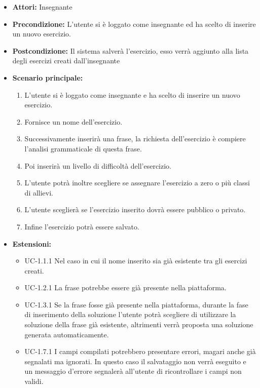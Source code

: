 	\begin{itemize}
		\item \textbf{Attori: }Insegnante
		\item \textbf{Precondizione: }L'utente si è loggato come insegnante ed ha scelto di inserire un nuovo esercizio.
		\item \textbf{Postcondizione: }Il sistema salverà l'esercizio, esso verrà aggiunto alla lista degli esercizi creati dall'insegnante
		\item \textbf{Scenario principale: }
		\begin{enumerate}
		\item L'utente si è loggato come insegnante e ha scelto di inserire un nuovo esercizio. 
		\item Fornisce un nome dell'esercizio. 
		\item Successivamente inserirà una frase, la richiesta dell'esercizio è compiere l'analisi grammaticale di questa frase. 
		\item Poi inserirà un livello di difficoltà dell'esercizio. 
		\item L'utente potrà inoltre scegliere se assegnare l'esercizio a zero o più classi di allievi.
		\item L'utente sceglierà se l'esercizio inserito dovrà essere pubblico o privato.
		\item Infine l'esercizio potrà essere salvato.
		\end{enumerate}
		
		\item \textbf{Estensioni: }
		\begin{itemize}
		\item UC-1.1.1 Nel caso in cui il nome inserito sia già esistente tra gli esercizi creati.
		\item UC-1.2.1 La frase potrebbe essere già presente nella piattaforma.
		\item UC-1.3.1 Se la frase fosse già presente nella piattaforma, durante la fase di inserimento della soluzione l'utente potrà scegliere di utilizzare la soluzione della frase già esistente, altrimenti verrà proposta una soluzione generata automaticamente.
		\item UC-1.7.1 I campi compilati potrebbero presentare errori, magari anche già segnalati ma ignorati. In questo caso il salvataggio non verrà eseguito e un messaggio d'errore segnalerà all'utente di ricontrollare i campi non validi.
		\end{itemize}
	\end{itemize}
